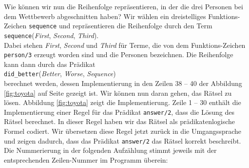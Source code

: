 Wie k\"{o}nnen wir nun die Reihenfolge repr\"{a}sentieren, in der die drei Personen bei dem 
Wettbewerb abgeschnitten haben?  Wir w\"{a}hlen ein dreistelliges Funktions-Zeichen
\texttt{sequence} und repr\"{a}sentieren die Reihenfolge durch den Term
\\[0.2cm]
\hspace*{1.3cm} \texttt{sequence}(\textsl{First}, \textsl{Second}, \textsl{Third}).\\[0.2cm]
Dabei stehen \textsl{First}, \textsl{Second} und \textsl{Third} f\"{u}r Terme, die von dem
Funktions-Zeichen \texttt{person/3} erzeugt worden sind und die Personen bezeichnen.
Die Reihenfolge kann dann durch das Pr\"{a}dikat \\[0.2cm]
\hspace*{1.3cm} \texttt{did\_better}(\textsl{Better}, \textsl{Worse}, \textsl{Sequence})
\\[0.2cm]
berechnet werden, dessen Implementierung in den Zeilen 38 -- 40 der Abbildung
\ref{fig:toyota} auf Seite \pageref{fig:toyota} gezeigt ist.
Wir k\"{o}nnen nun daran gehen, das R\"{a}tsel zu l\"{o}sen.  Abbildung
\ref{fig:toyota} zeigt die Implementierung.
Zeile 1 -- 30 enth\"{a}lt die Implementierung einer Regel f\"{u}r das
Pr\"{a}dikat \texttt{answer/2}, dass die L\"{o}sung des R\"{a}tsel berechnet.  
In dieser Regel haben wir das R\"{a}tsel als pr\"{a}dikatenlogische Formel
codiert.  Wir \"{u}bersetzen diese  Regel jetzt zur\"{u}ck in die Umgangssprache
und zeigen dadurch,  dass das Pr\"{a}dikat \texttt{answer/2} das R\"{a}tsel
korrekt beschreibt.  Die Nummerierung in der folgenden Aufz\"{a}hlung
stimmt jeweils mit der entsprechenden Zeilen-Nummer im Programm \"{u}berein:
